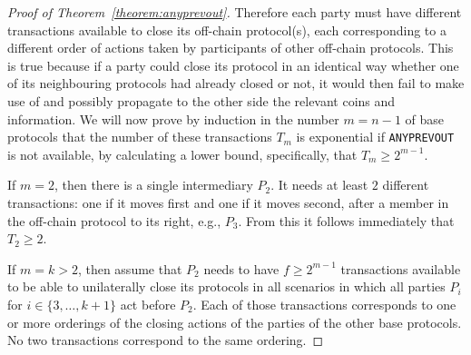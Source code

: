 \begin{proof}[Proof of Theorem~\ref{theorem:anyprevout}]
    Therefore each party must have different transactions available to close its
    off-chain protocol(s), each corresponding to a different order of actions
    taken by participants of other off-chain protocols. This is true because if
    a party could close its protocol in an identical way whether one of its
    neighbouring protocols had already closed or not, it would then fail to make
    use of and possibly propagate to the other side the relevant coins and
    information. We will now prove by induction in the number $m = n - 1$ of
    base protocols that the number of these transactions $T_m$ is exponential if
    \texttt{ANYPREVOUT} is not available, by calculating a lower bound, specifically,
    that $T_m \geq 2^{m-1}$. 

    If $m = 2$, then there is a single intermediary $P_2$. It needs at least $2$
    different transactions: one if it moves first and one if it moves second,
    after a member in the off-chain protocol to its right, e.g., $P_3$.
    From this it follows immediately that $T_2 \geq 2$. 

    If $m = k > 2$, then assume that $P_2$ needs to have $f\geq 2^{m-1}$ transactions
    available to be able to unilaterally close its protocols in all scenarios in
    which all parties $P_i$ for $i \in \{3, \dots, k+1\}$ act before $P_2$. Each
    of those transactions corresponds to one or more orderings of the closing
    actions of the parties of the other base protocols. No two transactions
    correspond to the same ordering.


\end{proof}
